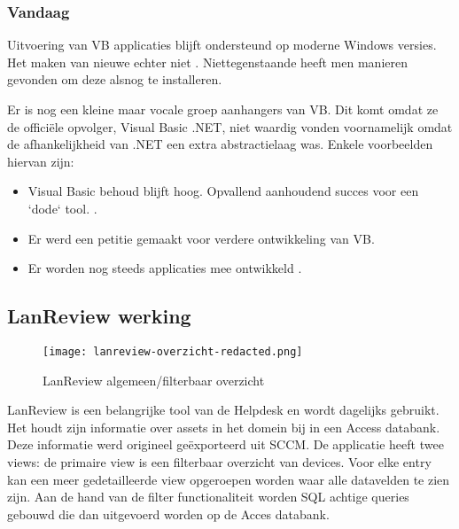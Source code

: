 \subsubsection{Vandaag}

Uitvoering van VB applicaties blijft ondersteund op moderne Windows versies. Het maken van nieuwe echter niet \autocite{MicrosoftDocs2018}. Niettegenstaande heeft men manieren gevonden om deze alsnog te installeren. \autocite{Brust2015}

Er is nog een kleine maar vocale groep aanhangers van VB. Dit komt omdat ze de officiële opvolger, Visual Basic .NET, niet waardig vonden voornamelijk omdat de afhankelijkheid van .NET een extra abstractielaag was. Enkele voorbeelden hiervan zijn: %
\begin{itemize}
    \item Visual Basic behoud blijft hoog. Opvallend aanhoudend succes voor een `dode` tool. \autocite{ISpliter2014}.
    \item Er werd een petitie gemaakt voor verdere ontwikkeling van VB. \autocite{2005}
    \item Er worden nog steeds applicaties mee ontwikkeld \autocite{Ippolito2018}.
\end{itemize}

\subsection{LanReview werking}


\begin{figure}[h!]
    \texttt{[image: lanreview-overzicht-redacted.png]}
    \caption{LanReview algemeen/filterbaar overzicht}
    \label{fig:lr-hoofd}
\end{figure}

LanReview is een belangrijke tool van de Helpdesk en wordt dagelijks gebruikt. Het houdt zijn informatie over assets in het domein bij in een Access databank. Deze informatie werd origineel geëxporteerd uit SCCM.
De applicatie heeft twee views: de primaire view is een filterbaar overzicht van devices. Voor elke entry kan een meer gedetailleerde view opgeroepen worden waar alle datavelden te zien zijn.
Aan de hand van de filter functionaliteit worden SQL achtige queries gebouwd die dan uitgevoerd worden op de Acces databank.

